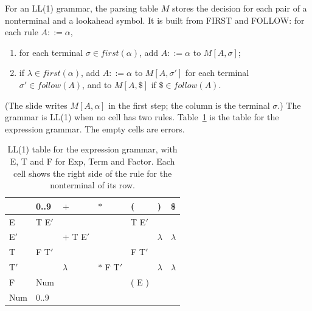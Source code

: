 For an LL(1) grammar, the parsing table $M$ stores the decision for each pair
of a nonterminal and a lookahead symbol. It is built from FIRST and FOLLOW:
for each rule $A ::= \alpha$,
\begin{enumerate}
  \item for each terminal $\sigma \in \mathit{first}(\alpha)$, add $A ::= \alpha$ to $M[A, \sigma]$;
  \item if $\lambda \in \mathit{first}(\alpha)$, add $A ::= \alpha$ to $M[A, \sigma']$ for each
    terminal $\sigma' \in \mathit{follow}(A)$, and to $M[A, \$]$ if $\$ \in \mathit{follow}(A)$.
\end{enumerate}
(The slide writes $M[A, \alpha]$ in the first step; the column is the terminal
$\sigma$.) The grammar is LL(1) when no cell has two rules.
Table~\ref{tab:ll1} is the table for the expression grammar. The empty cells
are errors.

\begin{table}[h]
\centering
\small
\renewcommand{\arraystretch}{1.15}
\begin{tabular}{l l l l l l l}
  \toprule
       & 0..9      & $+$          & $*$          & (          & )         & \$ \\
  \midrule
  E    & T E$'$    &              &              & T E$'$     &           & \\
  E$'$ &           & $+$ T E$'$   &              &            & $\lambda$ & $\lambda$ \\
  T    & F T$'$    &              &              & F T$'$     &           & \\
  T$'$ &           & $\lambda$    & $*$ F T$'$   &            & $\lambda$ & $\lambda$ \\
  F    & Num       &              &              & ( E )      &           & \\
  Num  & 0..9      &              &              &            &           & \\
  \bottomrule
\end{tabular}
\caption{LL(1) table for the expression grammar, with E, T and F for Exp, Term and Factor. Each cell shows the right side of the rule for the nonterminal of its row.}
\label{tab:ll1}
\end{table}


